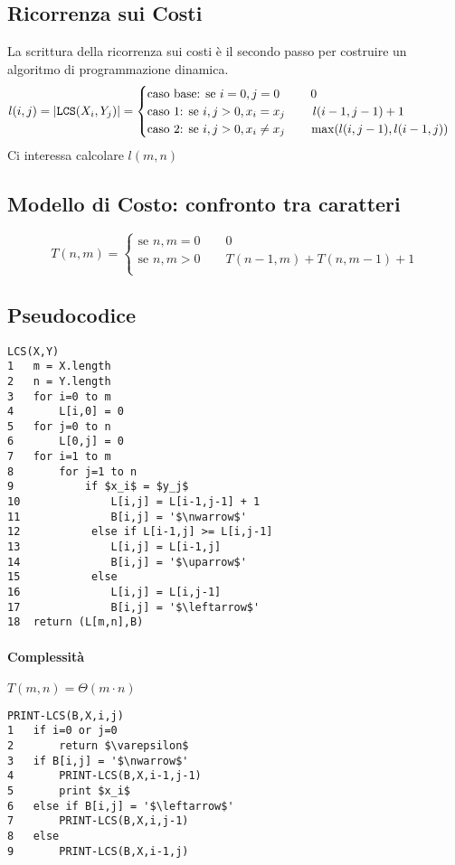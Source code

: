 \subsection{Ricorrenza sui Costi}
La scrittura della ricorrenza sui costi è il secondo passo per costruire un algoritmo di programmazione dinamica.
\begin{equation*}
l(i,j) = |\verb|LCS|(X_i,Y_j)| = 
\begin{cases}
    \text{caso base: se } i=0, j=0 \qquad\;\; 0 \\
    \text{caso 1: se } i,j>0, x_i = x_j \qquad\; l(i-1,j-1)+1 \\
    \text{caso 2: se } i,j>0, x_i \not= x_j \qquad \max(l(i,j-1),l(i-1,j))
\end{cases}
\end{equation*}
Ci interessa calcolare $l(m,n)$

\subsection{Modello di Costo: confronto tra caratteri}
\begin{equation*}
    T(n,m) =
    \begin{cases}
        \text{se } n,m=0 \qquad 0 \\
        \text{se } n,m>0 \qquad T(n-1,m) + T(n,m-1) + 1 \\
    \end{cases}
\end{equation*}

\subsection{Pseudocodice}
\begin{mdframed}
\begin{lstlisting}[mathescape=true]
LCS(X,Y)
1   m = X.length
2   n = Y.length
3   for i=0 to m
4       L[i,0] = 0
5   for j=0 to n
6       L[0,j] = 0
7   for i=1 to m
8       for j=1 to n
9           if $x_i$ = $y_j$
10              L[i,j] = L[i-1,j-1] + 1
11              B[i,j] = '$\nwarrow$'
12           else if L[i-1,j] >= L[i,j-1]
13              L[i,j] = L[i-1,j]
14              B[i,j] = '$\uparrow$'
15           else
16              L[i,j] = L[i,j-1]
17              B[i,j] = '$\leftarrow$'
18  return (L[m,n],B)
\end{lstlisting}
\end{mdframed}
\paragraph{Complessità} $T(m,n) = \Theta (m \cdot n)$	
\begin{mdframed}
\begin{lstlisting}[mathescape=true]
PRINT-LCS(B,X,i,j)
1   if i=0 or j=0
2       return $\varepsilon$
3   if B[i,j] = '$\nwarrow$'
4       PRINT-LCS(B,X,i-1,j-1)
5       print $x_i$
6   else if B[i,j] = '$\leftarrow$'
7       PRINT-LCS(B,X,i,j-1)
8   else
9       PRINT-LCS(B,X,i-1,j)
\end{lstlisting}
\end{mdframed}
